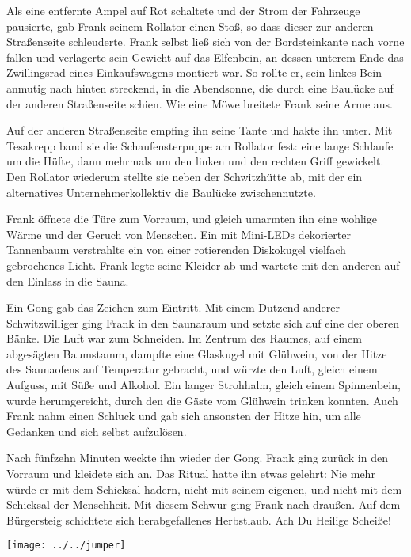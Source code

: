 \documentclass [a4paper, 11pt] {article}
\begin{document}
Als eine entfernte Ampel auf Rot schaltete und der Strom der Fahrzeuge pausierte, gab Frank seinem Rollator einen Stoß, so dass dieser zur anderen Straßenseite schleuderte. Frank selbst ließ sich von der Bordsteinkante nach vorne fallen und verlagerte sein Gewicht auf das Elfenbein, an dessen unterem Ende das Zwillingsrad eines Einkaufswagens montiert war. So rollte er, sein linkes Bein anmutig nach hinten streckend, in die Abendsonne, die durch eine Baulücke auf der anderen Straßenseite schien. Wie eine Möwe breitete Frank seine Arme aus.

Auf der anderen Straßenseite empfing ihn seine Tante und hakte ihn unter. Mit Tesakrepp band sie die Schaufensterpuppe am Rollator fest: eine lange Schlaufe um die Hüfte, dann mehrmals um den linken und den rechten Griff gewickelt. Den Rollator wiederum stellte sie neben der Schwitzhütte ab, mit der ein alternatives Unternehmerkollektiv die Baulücke zwischennutzte.

Frank öffnete die Türe zum Vorraum, und gleich umarmten ihn eine wohlige Wärme und der Geruch von Menschen. Ein mit Mini-LEDs dekorierter Tannenbaum verstrahlte ein von einer rotierenden Diskokugel vielfach gebrochenes Licht. Frank legte seine Kleider ab und wartete mit den anderen auf den Einlass in die Sauna. 

Ein Gong gab das Zeichen zum Eintritt. Mit einem Dutzend anderer Schwitzwilliger ging Frank in den Saunaraum und setzte sich auf eine der oberen Bänke. Die Luft war zum Schneiden. Im Zentrum des Raumes, auf einem abgesägten Baumstamm, dampfte eine Glaskugel mit Glühwein, von der Hitze des Saunaofens auf Temperatur gebracht, und würzte den Luft, gleich einem Aufguss, mit Süße und Alkohol. Ein langer Strohhalm, gleich einem Spinnenbein, wurde herumgereicht, durch den die Gäste vom Glühwein trinken konnten. Auch Frank nahm einen Schluck und gab sich ansonsten der Hitze hin, um alle Gedanken und sich selbst aufzulösen.


Nach fünfzehn Minuten weckte ihn wieder der Gong. Frank ging zurück in den Vorraum und kleidete sich an. Das Ritual hatte ihn etwas gelehrt: Nie mehr würde er mit dem Schicksal hadern, nicht mit seinem eigenen, und nicht mit dem Schicksal der Menschheit. Mit diesem Schwur ging Frank nach draußen. Auf dem Bürgersteig schichtete sich herabgefallenes Herbstlaub. Ach Du Heilige Scheiße!
\begin{center}
\texttt{[image: ../../jumper]}%
\end{center}
\end{document}

